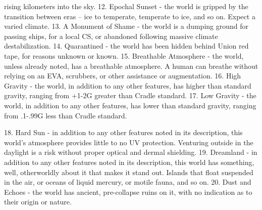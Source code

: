         rising kilometers into the sky.   
    12. Epochal Sunset - the world is gripped by the transition between eras -- ice to temperate,  
        temperate to ice, and so on. Expect a varied climate.   
    13. A Monument of Shame - the world is a dumping ground for passing ships, for a local CS,  
        or abandoned following massive climate destabilization.   
    14. Quarantined - the world has been hidden behind Union red tape, for reasons unknown or  
        known.     
    15. Breathable Atmosphere - the world, unless already noted, has a breathable atmosphere. A  
        human can breathe without relying on an EVA, scrubbers, or other assistance or  
        augmentation.   
    16. High Gravity - the world, in addition to any other features, has higher than standard gravity,  
        ranging from +1-2G greater than Cradle standard.    
    17. Low Gravity - the world, in addition to any other features, has lower than standard gravity,  
        ranging from .1-.99G less than Cradle standard.   

                                                                                                         


    18. Hard Sun - in addition to any other features noted in its description, this world’s  
        atmosphere provides little to no UV protection. Venturing outside in the daylight is a risk  
        without proper optical and dermal shielding.   
    19. Dreamland - in addition to any other features noted in its description, this world has  
        something, well, otherworldly about it that makes it stand out. Islands that float suspended  
        in the air, or oceans of liquid mercury, or motile fauna, and so on.   
    20. Dust and Echoes - the world has ancient, pre-collapse ruins on it, with no indication as to  
        their origin or nature.  

